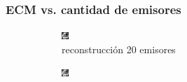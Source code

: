 \documentclass[11pt]{beamer}
\begin{document}
\begin{frame}
    \frametitle{ECM vs. cantidad de emisores}
    
    \begin{figure}[H]
        \centering
    
        \begin{subfigure}[h]{0.3\textwidth} 
            \includegraphics[width=\textwidth]{img/tomo_emisores_20.png}
            \caption{reconstrucción 20 emisores}
            \label{fig:reconstruccion 20 emisores}
        \end{subfigure}%
        \hfill
        \begin{subfigure}[h]{0.3\textwidth}
            \includegraphics[width=\textwidth]{img/tomo_emisores_60.png}

\end{subfigure}
\end{figure}
\end{frame}
\end{document}
